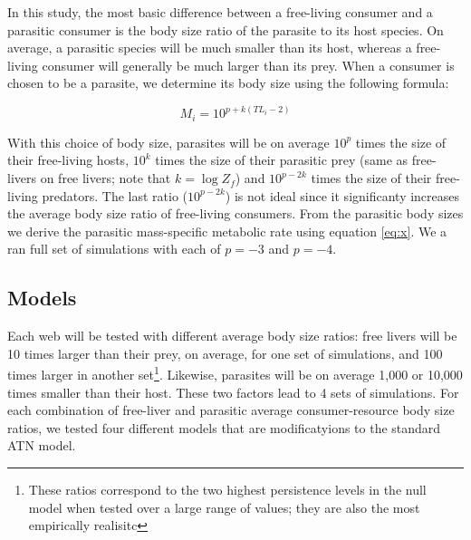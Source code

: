 \documentclass[11pt]{amsart}
\begin{document}
 In this study, the most basic difference between a free-living consumer and a parasitic consumer is the body size ratio of the parasite to its host species.  On average, a parasitic species will be much smaller than its host, whereas a free-living consumer will generally be much larger than its prey.  When a consumer is chosen to be a parasite, we determine its body size using the following formula:

\begin{equation}
M_i = 10^{p + k(TL_i -2)} \label{eq:Mpara}
\end{equation}

With this choice of body size, parasites will be on average $10^{p}$ times the size of their free-living hosts, $10^k$ times the size of their parasitic prey (same as free-livers on free livers; note that $k = \log Z_f$) and $10^{p-2k}$ times the size of their free-living predators.  The last ratio ($10^{p-2k}$) is not ideal since it significanty increases the average body size ratio of free-living consumers.  From the parasitic body sizes we derive the parasitic mass-specific metabolic rate using equation \ref{eq:x}.  We a ran full set of simulations with each of $p=-3$ and $p=-4$.

\subsection{Models}

Each web will be tested with different average body size ratios: free livers will be 10 times larger than their prey, on average, for one set of simulations, and 100 times larger in another set\footnote{These ratios correspond to the two highest persistence levels in the null model when tested over a large range of values; they are also the most empirically realisitc}.  Likewise, parasites will be on average 1,000 or 10,000 times smaller than their host.  These two factors lead to 4 sets of simulations.  For each combination of free-liver and parasitic average consumer-resource body size ratios, we tested four different models that are modificatyions to the standard ATN model.
\end{document}
